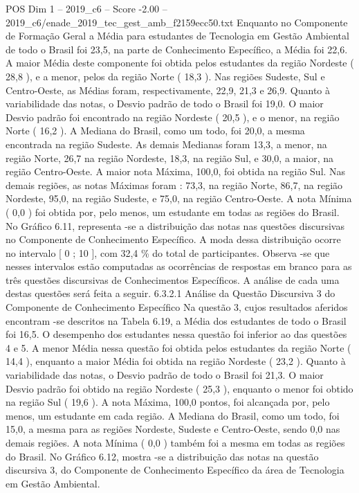 \begin{textsample}{POS Dim 1 – 2019\_c6 – Score -2.00 – 2019\_c6/enade\_2019\_tec\_gest\_amb\_f2159ecc50.txt}
Enquanto no Componente de Formação Geral a Média para estudantes de Tecnologia em Gestão Ambiental de todo o Brasil foi 23,5, na parte de Conhecimento Específico, a Média foi 22,6.
A maior Média deste componente foi obtida pelos estudantes da região Nordeste ( 28,8 ), e a menor, pelos da região Norte ( 18,3 ).
Nas regiões Sudeste, Sul e Centro-Oeste, as Médias foram, respectivamente, 22,9, 21,3 e 26,9.
Quanto à variabilidade das notas, o Desvio padrão de todo o Brasil foi 19,0.
O maior Desvio padrão foi encontrado na região Nordeste ( 20,5 ), e o menor, na região Norte ( 16,2 ).
A Mediana do Brasil, como um todo, foi 20,0, a mesma encontrada na região Sudeste.
As demais Medianas foram 13,3, a menor, na região Norte, 26,7 na região Nordeste, 18,3, na região Sul, e 30,0, a maior, na região Centro-Oeste.
A maior nota Máxima, 100,0, foi obtida na região Sul.
Nas demais regiões, as notas Máximas foram : 73,3, na região Norte, 86,7, na região Nordeste, 95,0, na região Sudeste, e 75,0, na região Centro-Oeste.
A nota Mínima ( 0,0 ) foi obtida por, pelo menos, um estudante em todas as regiões do Brasil.
No Gráfico 6.11, representa -se a distribuição das notas nas questões discursivas no Componente de Conhecimento Específico.
A moda dessa distribuição ocorre no intervalo [ 0 ; 10 ], com 32,4 \% do total de participantes.
Observa -se que nesses intervalos estão computadas as ocorrências de respostas em branco para as três questões discursivas de Conhecimentos Específicos.
A análise de cada uma destas questões será feita a seguir. 6.3.2.1 Análise da Questão Discursiva 3 do Componente de Conhecimento Específico Na questão 3, cujos resultados aferidos encontram -se descritos na Tabela 6.19, a Média dos estudantes de todo o Brasil foi 16,5.
O desempenho dos estudantes nessa questão foi inferior ao das questões 4 e 5.
A menor Média nessa questão foi obtida pelos estudantes da região Norte ( 14,4 ), enquanto a maior Média foi obtida na região Nordeste ( 23,2 ).
Quanto à variabilidade das notas, o Desvio padrão de todo o Brasil foi 21,3.
O maior Desvio padrão foi obtido na região Nordeste ( 25,3 ), enquanto o menor foi obtido na região Sul ( 19,6 ).
A nota Máxima, 100,0 pontos, foi alcançada por, pelo menos, um estudante em cada região.
A Mediana do Brasil, como um todo, foi 15,0, a mesma para as regiões Nordeste, Sudeste e Centro-Oeste, sendo 0,0 nas demais regiões.
A nota Mínima ( 0,0 ) também foi a mesma em todas as regiões do Brasil.
No Gráfico 6.12, mostra -se a distribuição das notas na questão discursiva 3, do Componente de Conhecimento Específico da área de Tecnologia em Gestão Ambiental.

\end{textsample}
